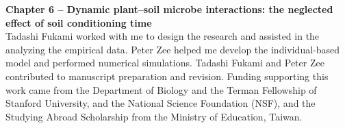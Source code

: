 \noindent \textbf{Chapter 6 -- Dynamic plant--soil microbe interactions: the neglected effect of soil conditioning time}\\
\noindent Tadashi Fukami worked with me to design the research and assisted in the analyzing the empirical data. Peter Zee helped me develop the individual-based model and performed numerical simulations. Tadashi Fukami and Peter Zee contributed to manuscript preparation and revision. Funding supporting this work came from the Department of Biology and the Terman Fellowship of Stanford University, and the National Science Foundation (NSF), and the Studying Abroad Scholarship from the Ministry of Education, Taiwan.




